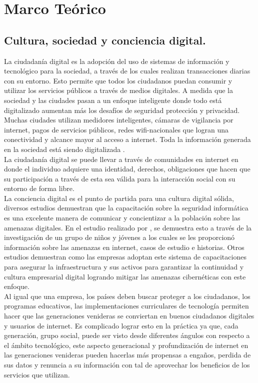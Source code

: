 \chapter{Marco Teórico}\label{cap:capitulo_2}

\section{Cultura, sociedad y conciencia digital.}\label{section:Cultura, sociedad y conciencia digital.}
La ciudadanía digital es la adopción del uso de sistemas de información y tecnológico para la sociedad, a través de los cuales realizan transacciones diarias con su entorno. Esto permite que todos los ciudadanos puedan consumir y utilizar los servicios públicos a través de medios digitales\cite{Popkova2020}.
A medida que la sociedad y las ciudades pasan a un enfoque inteligente donde todo está digitalizado aumentan más los desafíos de seguridad protección y privacidad. Muchas ciudades utilizan medidores inteligentes, cámaras de vigilancia por internet, pagos de servicios públicos, redes wifi-nacionales que logran una conectividad y alcance mayor al acceso a internet. Toda la información generada en la sociedad está siendo digitalizada \cite{Konkolewsky2017}. \\
La ciudadanía digital se puede llevar a través de comunidades en internet en donde el individuo adquiere una identidad, derechos, obligaciones que hacen que su participación a través de esta sea válida para la interacción social con su entorno de forma libre\cite{Popkova2020}. \\
La conciencia digital es el punto de partida para una cultura digital sólida, diversos estudios demuestran que la capacitación sobre la seguridad informática es una excelente manera de comunicar y concientizar a la población sobre las amenazas digitales. En el estudio realizado por \cite{}, se demuestra esto a través de la investigación de un grupo de niños y jóvenes a los cuales se les proporcionó información sobre las amenazas en internet, casos de estudio e historias. Otros estudios demuestran como las empresas adoptan este sistema de capacitaciones para asegurar la infraestructura y sus activos para garantizar la continuidad y cultura empresarial digital logrando mitigar las amenazas cibernéticas con este enfoque. \cite{Li2021}\\
Al igual que una empresa, los países deben buscar proteger a los ciudadanos, los programas educativos, las implementaciones curriculares de tecnología permiten hacer que las generaciones venideras se conviertan en buenos ciudadanos digitales y usuarios de internet. Es complicado lograr esto en la práctica ya que, cada generación, grupo social, puede ser visto desde diferentes ángulos con respecto a el ámbito tecnológico, este aspecto generacional y profundización de internet en las generaciones venideras pueden hacerlas más propensas a engaños, perdida de sus datos y renuncia a su información con tal de aprovechar los beneficios de los servicios que utilizan\cite{Francis2022}. \\
